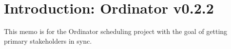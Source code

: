 \documentclass[11pt]{article}
\begin{document}
	\section{Introduction: Ordinator v0.2.2}
	This memo is for the Ordinator scheduling project with the goal
	of getting primary stakeholders in sync.
	
	
	
	
	
\end{document}

